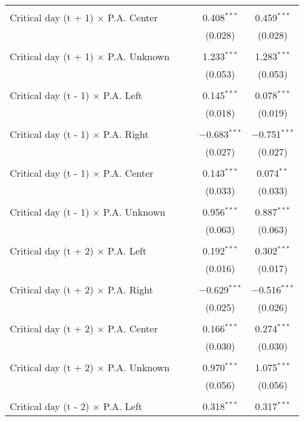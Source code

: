\documentclass[
]{article}
\begin{document}
\begin{table}[!htbp]
{\begin{tabular}{@{\extracolsep{5pt}}lcccc}
  & & & & \\ 
 Critical day (t + 1) $\times$ P.A. Center &  &  & 0.408$^{***}$ & 0.459$^{***}$ \\ 
  &  &  & (0.028) & (0.028) \\ 
  & & & & \\ 
 Critical day (t + 1) $\times$ P.A. Unknown &  &  & 1.233$^{***}$ & 1.283$^{***}$ \\ 
  &  &  & (0.053) & (0.053) \\ 
  & & & & \\ 
 Critical day (t - 1) $\times$ P.A. Left &  &  & 0.145$^{***}$ & 0.078$^{***}$ \\ 
  &  &  & (0.018) & (0.019) \\ 
  & & & & \\ 
 Critical day (t - 1) $\times$ P.A. Right &  &  & $-$0.683$^{***}$ & $-$0.751$^{***}$ \\ 
  &  &  & (0.027) & (0.027) \\ 
  & & & & \\ 
 Critical day (t - 1) $\times$ P.A. Center &  &  & 0.143$^{***}$ & 0.074$^{**}$ \\ 
  &  &  & (0.033) & (0.033) \\ 
  & & & & \\ 
 Critical day (t - 1) $\times$ P.A. Unknown &  &  & 0.956$^{***}$ & 0.887$^{***}$ \\ 
  &  &  & (0.063) & (0.063) \\ 
  & & & & \\ 
 Critical day (t + 2) $\times$ P.A. Left &  &  & 0.192$^{***}$ & 0.302$^{***}$ \\ 
  &  &  & (0.016) & (0.017) \\ 
  & & & & \\ 
 Critical day (t + 2) $\times$ P.A. Right &  &  & $-$0.629$^{***}$ & $-$0.516$^{***}$ \\ 
  &  &  & (0.025) & (0.026) \\ 
  & & & & \\ 
 Critical day (t + 2) $\times$ P.A. Center &  &  & 0.166$^{***}$ & 0.274$^{***}$ \\ 
  &  &  & (0.030) & (0.030) \\ 
  & & & & \\ 
 Critical day (t + 2) $\times$ P.A. Unknown &  &  & 0.970$^{***}$ & 1.075$^{***}$ \\ 
  &  &  & (0.056) & (0.056) \\ 
  & & & & \\ 
 Critical day (t - 2) $\times$ P.A. Left &  &  & 0.318$^{***}$ & 0.317$^{***}$ \\ 

\end{tabular}}
\end{table}
\end{document}
